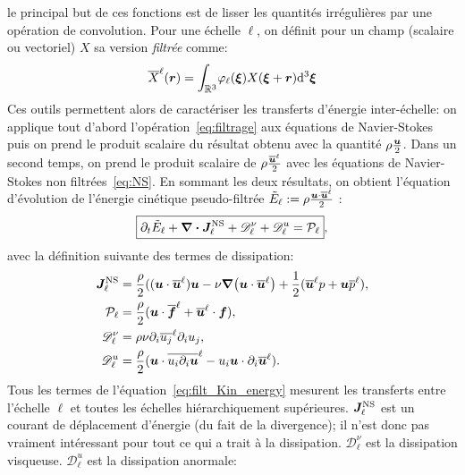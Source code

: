 \documentclass[13pt, a4paper]{extarticle}
\newcommand{\filt}[1]{\overline{#1}^\ell}
\begin{document}
le principal but de ces fonctions est de lisser les quantités irrégulières par une 
opération de convolution. Pour une échelle $\ell$, on définit pour un champ 
(scalaire ou vectoriel) $X$ sa version \emph{filtrée} comme:
\begin{align}
    \filt{X}(\git{r}) = \mathlarger{\int_{\mathbb{R}^3}}\varphi_\ell(\git{\xi})
    X(\git{\xi}+\git{r})\dd^3\git{\xi}
    \label{eq:filtrage}
\end{align}
Ces outils permettent alors de caractériser les transferts d'énergie inter-échelle: 
on applique tout d'abord l'opération~\eqref{eq:filtrage} aux équations de Navier-Stokes 
puis on prend le produit scalaire du résultat obtenu avec la quantité 
$\rho\frac{\boldsymbol{u}}{2}$. Dans un second temps, on prend le produit scalaire de 
$\rho\frac{\filt{\git{u}}}{2}$ avec les équations de Navier-Stokes non 
filtrées~\eqref{eq:NS}. En sommant les deux résultats, on obtient l'équation 
d'évolution de l'énergie cinétique pseudo-filtrée 
$\tilde{E}_\ell:=\rho\frac{\git{u}\cdot\filt{\git{u}}}{2}$ \cite{Creff_2023}: 
\begin{align}
    \boxed{\partial_t \tilde{E}_\ell + \div{\boldsymbol{J}^{\text{NS}}_\ell} + 
    \mathscr{D}^\nu_\ell + \mathscr{D}^{u}_\ell
    = \mathcal{P}_\ell},
    \label{eq:filt_Kin_energy}
\end{align}
avec la définition suivante des termes de dissipation:
\begin{align}
    \git{J}^{\text{NS}}_\ell &=  \frac{\rho}{2}( (\git{u}\cdot\filt{\git{u}})\git{u} 
    - \nu \grad (\git{u}\cdot\filt{\git{u}}) + \frac{1}{2}(\filt{\git{u}} p + 
    \git{u} \filt{p}), \\ 
    \mathcal{P}_\ell &=   \frac{\rho}{2} (\git{u} \cdot \filt{\git{f}} + 
    \filt{\git{u}} \cdot \git{f} ), \\
    \mathscr{D}^\nu_\ell &=  \rho \nu \del_i \filt{u_j} \del_i u_j,  \\
    \mathscr{D}^{u}_\ell &=   \frac{\rho}{2} (\git{u}\cdot  \filt{u_i  \del_i \git{u}}
     -  u_i\git{u}\cdot \del_i \filt{\git{u}}).\label{eq:Du}
\end{align}
Tous les termes de l'équation~\eqref{eq:filt_Kin_energy} mesurent les transferts 
entre l'échelle $\ell$ et toutes les échelles hiérarchiquement supérieures. 
$\boldsymbol{J}^{\text{NS}}_\ell$ est un courant de déplacement d'énergie (du fait de la 
divergence); il n'est donc pas vraiment intéressant pour tout ce qui a trait à la 
dissipation. $\mathscr{D}^\nu_\ell$ est la dissipation visqueuse. 
$\mathscr{D}^{u}_\ell$ est la dissipation anormale:
\end{document}
